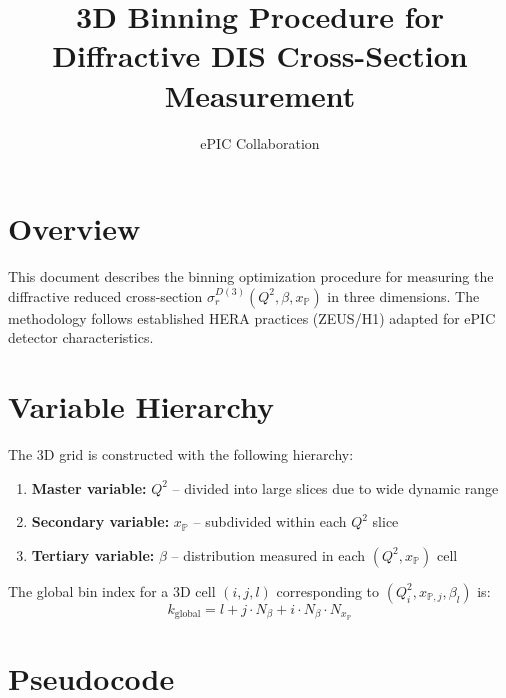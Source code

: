 \documentclass[11pt,a4paper]{article}
\title{3D Binning Procedure for Diffractive DIS Cross-Section Measurement}
\author{ePIC Collaboration}
\date{}
\begin{document}
\maketitle

\section{Overview}

This document describes the binning optimization procedure for measuring the diffractive reduced cross-section $\sigma_r^{D(3)}(Q^2, \beta, x_\mathbb{P})$ in three dimensions. The methodology follows established HERA practices (ZEUS/H1) adapted for ePIC detector characteristics.

\section{Variable Hierarchy}

The 3D grid is constructed with the following hierarchy:
\begin{enumerate}
    \item \textbf{Master variable:} $Q^2$ -- divided into large slices due to wide dynamic range
    \item \textbf{Secondary variable:} $x_\mathbb{P}$ -- subdivided within each $Q^2$ slice
    \item \textbf{Tertiary variable:} $\beta$ -- distribution measured in each $(Q^2, x_\mathbb{P})$ cell
\end{enumerate}

The global bin index for a 3D cell $(i, j, l)$ corresponding to $(Q^2_i, x_{\mathbb{P},j}, \beta_l)$ is:
\begin{equation}
    k_{\text{global}} = l + j \cdot N_\beta + i \cdot N_\beta \cdot N_{x_\mathbb{P}}
\end{equation}

\section{Pseudocode}
\end{document}
